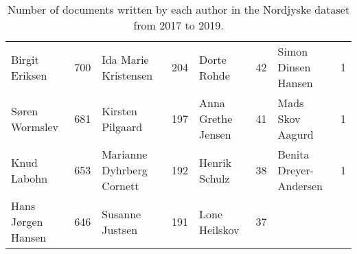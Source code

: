 \begin{table*}[h]
\begin{tabular}{l|c|l|c|l|c|l|c}
		Birgit Eriksen        &  700   & Ida Marie Kristensen       &  204   & Dorte Rohde                  &   42   & Simon Dinsen Hansen          &   1    \\
		Søren Wormslev        &  681   & Kirsten Pilgaard           &  197   & Anna Grethe Jensen           &   41   & Mads Skov Aagurd             &   1    \\
		Knud Labohn           &  653   & Marianne Dyhrberg Cornett  &  192   & Henrik Schulz                &   38   & Benita Dreyer-Andersen       &   1    \\
		Hans Jørgen Hansen    &  646   & Susanne Justsen            &  191   & Lone Heilskov                &   37   &                              &        \\
		\bottomrule
	\end{tabular}
	\caption{Number of documents written by each author in the Nordjyske dataset from 2017 to 2019.}
	\label{tab:author_table}
\end{table*}
